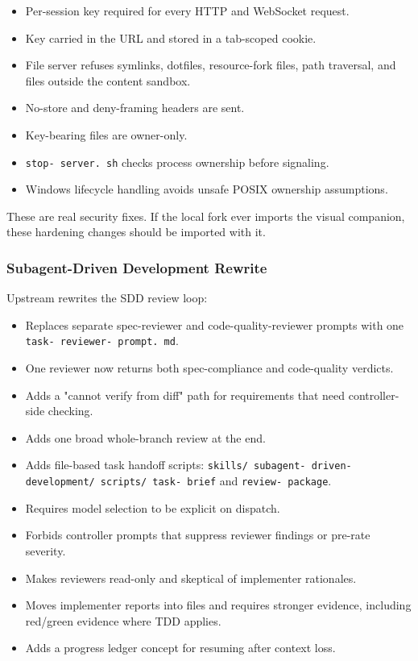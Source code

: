 \documentclass[twocolumn,10pt,letterpaper]{article}
\begin{document}
\begin{itemize}
\setlength{\itemsep}{0pt}
\setlength{\parskip}{0pt}
  \item Per-session key required for every HTTP and WebSocket request.
  \item Key carried in the URL and stored in a tab-scoped cookie.
  \item File server refuses symlinks, dotfiles, resource-fork files, path traversal, and files outside the content sandbox.
  \item No-store and deny-framing headers are sent.
  \item Key-bearing files are owner-only.
  \item \texttt{stop- server. sh} checks process ownership before signaling.
  \item Windows lifecycle handling avoids unsafe POSIX ownership assumptions.
\end{itemize}

These are real security fixes. If the local fork ever imports the visual companion, these hardening changes should be imported with it.


\subsubsection{Subagent-Driven Development Rewrite}

Upstream rewrites the SDD review loop:


\begin{itemize}
\setlength{\itemsep}{0pt}
\setlength{\parskip}{0pt}
  \item Replaces separate spec-reviewer and code-quality-reviewer prompts with one \texttt{task- reviewer- prompt. md}.
  \item One reviewer now returns both spec-compliance and code-quality verdicts.
  \item Adds a "cannot verify from diff" path for requirements that need controller-side checking.
  \item Adds one broad whole-branch review at the end.
  \item Adds file-based task handoff scripts: \texttt{skills/ subagent- driven- development/ scripts/ task- brief} and \texttt{review- package}.
  \item Requires model selection to be explicit on dispatch.
  \item Forbids controller prompts that suppress reviewer findings or pre-rate severity.
  \item Makes reviewers read-only and skeptical of implementer rationales.
  \item Moves implementer reports into files and requires stronger evidence, including red/green evidence where TDD applies.
  \item Adds a progress ledger concept for resuming after context loss.
\end{itemize}
\end{document}

